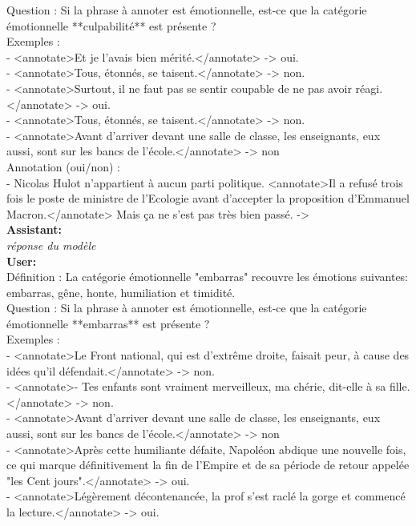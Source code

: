 {Question : Si la phrase à annoter est émotionnelle, est-ce que la catégorie émotionnelle **culpabilité** est présente ?\\

Exemples :\\
- <annotate>Et je l'avais bien mérité.</annotate> -> oui.\\
- <annotate>Tous, étonnés, se taisent.</annotate> -> non.\\
- <annotate>Surtout, il ne faut pas se sentir coupable de ne pas avoir réagi.</annotate> -> oui.\\
- <annotate>Tous, étonnés, se taisent.</annotate> -> non.\\
- <annotate>Avant d'arriver devant une salle de classe, les enseignants, eux aussi, sont sur les bancs de l'école.</annotate> -> non\\

Annotation (oui/non) :\\
- Nicolas Hulot n’appartient à aucun parti politique. <annotate>Il a refusé trois fois le poste de ministre de l’Ecologie avant d’accepter la proposition d’Emmanuel Macron.</annotate> Mais ça ne s’est pas très bien passé.  -> \\

\textbf{Assistant:}\\
\textit{réponse du modèle}\\

\textbf{User:}\\
Définition : La catégorie émotionnelle "embarras" recouvre les émotions suivantes: embarras, gêne, honte, humiliation et timidité.\\

Question : Si la phrase à annoter est émotionnelle, est-ce que la catégorie émotionnelle **embarras** est présente ?\\

Exemples :\\
- <annotate>Le Front national, qui est d'extrême droite, faisait peur, à cause des idées qu'il défendait.</annotate> -> non.\\
- <annotate>- Tes enfants sont vraiment merveilleux, ma chérie, dit-elle à sa fille.</annotate> -> non.\\
- <annotate>Avant d'arriver devant une salle de classe, les enseignants, eux aussi, sont sur les bancs de l'école.</annotate> -> non\\
- <annotate>Après cette humiliante défaite, Napoléon abdique une nouvelle fois, ce qui marque définitivement la fin de l'Empire et de sa période de retour appelée "les Cent jours".</annotate> -> oui.\\
- <annotate>Légèrement décontenancée, la prof s'est raclé la gorge et commencé la lecture.</annotate> -> oui.\\

}
